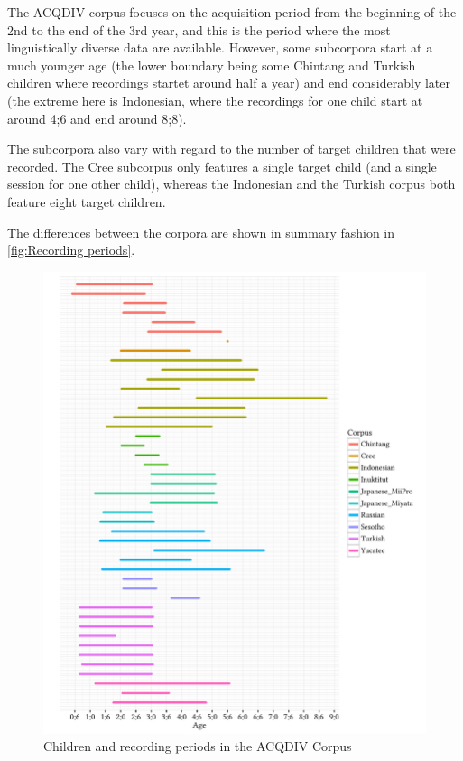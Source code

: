 \documentclass[a4paper, 11pt]{book}
\begin{document}
The ACQDIV corpus focuses on the acquisition period from the beginning of the 2nd to the end of the 3rd year, and this is the period where the most linguistically diverse data are available. However, some subcorpora start at a much younger age (the lower boundary being some Chintang and Turkish children where recordings startet around half a year) and end considerably later (the extreme here is Indonesian, where the recordings for one child start at around 4;6 and end around 8;8). 

The subcorpora also vary with regard to the number of target children that were recorded. The Cree subcorpus only features a single target child (and a single session for one other child), whereas the Indonesian and the Turkish corpus both feature eight target children. 

The differences between the corpora are shown in summary fashion in \autoref{fig:Recording periods}. 

\begin{figure}
	\centering
	\includegraphics[scale=0.8]{pics/age_spans_acqdiv_corpora.pdf}
	\caption{Children and recording periods in the ACQDIV Corpus}
	\label{fig:Recording periods}
\end{figure}
\end{document}
